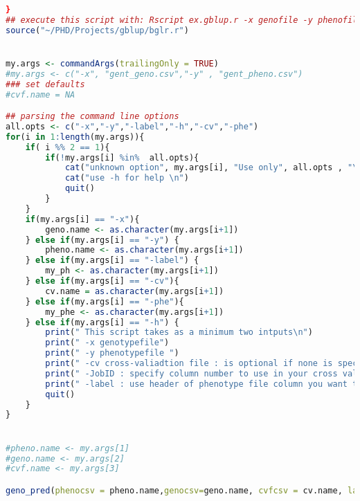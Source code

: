 \begin{lstlisting}[language=R]
  }
## execute this script with: Rscript ex.gblup.r -x genofile -y phenofile -c cv file
source("~/PHD/Projects/gblup/bglr.r")


my.args <- commandArgs(trailingOnly = TRUE)
#my.args <- c("-x", "gent_geno.csv","-y" , "gent_pheno.csv")
### set defaults 
#cvf.name = NA

## parsing the command line options 
all.opts <- c("-x","-y","-label","-h","-cv","-phe")
for(i in 1:length(my.args)){
    if( i %% 2 == 1){
        if(!my.args[i] %in%  all.opts){
            cat("unknown option", my.args[i], "Use only", all.opts , "\n")
            cat("use -h for help \n")
            quit()
        }
    }    
    if(my.args[i] == "-x"){
        geno.name <- as.character(my.args[i+1])
    } else if(my.args[i] == "-y") {
        pheno.name <- as.character(my.args[i+1])
    } else if(my.args[i] == "-label") {
        my_ph <- as.character(my.args[i+1])
    } else if(my.args[i] == "-cv"){
        cv.name = as.character(my.args[i+1])
    } else if(my.args[i] == "-phe"){
        my_phe <- as.character(my.args[i+1])
    } else if(my.args[i] == "-h") {
        print(" This script takes as a minimum two intputs\n")
        print(" -x genotypefile")
        print(" -y phenotypefile ")
        print(" -cv cross-valiadtion file : is optional if none is specified random 5 fold cv will be used")
        print(" -JobID : specify column number to use in your cross validation file")
        print(" -label : use header of phenotype file column you want to use")
        quit()
    }
}


#pheno.name <- my.args[1]
#geno.name <- my.args[2]
#cvf.name <- my.args[3]

geno_pred(phenocsv = pheno.name,genocsv=geno.name, cvfcsv = cv.name, label=my_ph,mod = "BRR", phe =my_phe)

\end{lstlisting}


